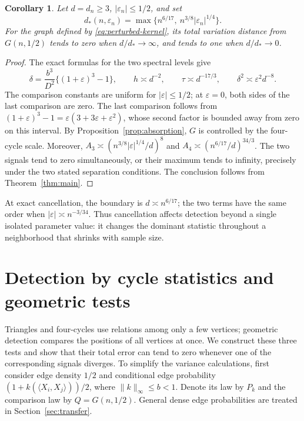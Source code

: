 \documentclass[11pt,reqno]{amsart}
\numberwithin{equation}{section}
\newtheorem{corollary}[theorem]{Corollary}
\theoremstyle{definition}
\theoremstyle{remark}
\theoremstyle{definition}
\begin{document}
\begin{corollary}\label{cor:quadratic}
Let $d=d_n\ge3$, $|\varepsilon_n|\le1/2$, and set
\[
 d_*(n,\varepsilon_n)=
 \max\{n^{6/17},\ n^{3/8}|\varepsilon_n|^{1/4}\}.
\]
For the graph defined by \eqref{eq:perturbed-kernel},
its total variation distance from $G(n,1/2)$ tends to zero when $d/d_*\to\infty$,
and tends to one when $d/d_*\to0$.
\end{corollary}
\begin{proof}
The exact formulas for the two spectral levels give
\[
 \delta=\frac{b^3}{D^2}\{(1+\varepsilon)^3-1\},\qquad
 h\asymp d^{-2},\qquad \tau\asymp d^{-17/3},
 \qquad \delta^2\asymp\varepsilon^2d^{-8}.
\]
The comparison constants are uniform for $|\varepsilon|\le1/2$; at $\varepsilon=0$, both sides of the last comparison are zero.
The last comparison follows from $(1+\varepsilon)^3-1=\varepsilon(3+3\varepsilon+\varepsilon^2)$,
whose second factor is bounded away from zero on this interval.
By Proposition~\ref{prop:absorption}, $G$ is controlled by the four-cycle scale.
Moreover, $A_3\asymp(n^{3/8}|\varepsilon|^{1/4}/d)^8$ and
$A_4\asymp(n^{6/17}/d)^{34/3}$.
The two signals tend to zero simultaneously, or their maximum tends to infinity, precisely under the two stated separation conditions.
The conclusion follows from Theorem~\ref{thm:main}.
\end{proof}
At exact cancellation, the boundary is $d\asymp n^{6/17}$;
the two terms have the same order when $|\varepsilon|\asymp n^{-3/34}$.
Thus cancellation affects detection beyond a single isolated parameter value:
it changes the dominant statistic throughout a neighborhood that shrinks with sample size.

\section{Detection by cycle statistics and geometric tests}\label{sec:detection}
Triangles and four-cycles use relations among only a few vertices; geometric detection compares the positions of all vertices at once.
We construct these three tests and show that their total error can tend to zero whenever one of the corresponding signals diverges.
To simplify the variance calculations, first consider edge density $1/2$ and conditional edge probability
$(1+k(\langle X_i,X_j\rangle))/2$, where $\|k\|_\infty\le b<1$.
Denote its law by $P_k$ and the comparison law by $Q=G(n,1/2)$.
General dense edge probabilities are treated in Section~\ref{sec:transfer}.
\end{document}
